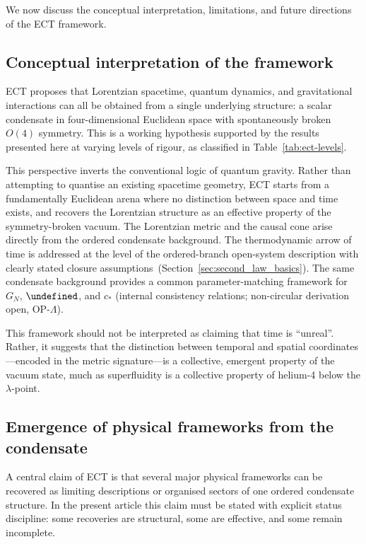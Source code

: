 \documentclass[11pt,a4paper]{article}
\let\hbar\undefined
\numberwithin{equation}{section}
\begin{document}
We now discuss the conceptual interpretation, limitations,
and future directions of the ECT framework.

\subsection{Conceptual interpretation of the framework}

ECT proposes that Lorentzian spacetime, quantum dynamics, and
gravitational interactions can all be obtained from a single
underlying structure: a scalar condensate in four-dimensional
Euclidean space with spontaneously broken $O(4)$ symmetry.
This is a working hypothesis supported by the results presented
here at varying levels of rigour, as classified in
Table~\ref{tab:ect-levels}.

This perspective inverts the conventional logic of quantum gravity.
Rather than attempting to quantise an existing spacetime geometry, ECT
starts from a fundamentally Euclidean arena where no distinction
between space and time exists, and recovers the Lorentzian structure
as an effective property of the symmetry-broken vacuum.  The
Lorentzian metric and the causal cone arise directly from the
ordered condensate background.
The thermodynamic arrow of time is addressed at the level of the
ordered-branch open-system description with clearly stated closure
assumptions~(Section~\ref{sec:second_law_basics}).
The same condensate background provides a common
parameter-matching framework for $G_N$, $\hbar$, and $c_*$
(internal consistency relations; non-circular derivation open, OP-$\Lambda$).

This framework should not be interpreted as claiming that time is
``unreal''.  Rather, it suggests that the distinction between temporal
and spatial coordinates---encoded in the metric signature---is a
collective, emergent property of the vacuum state, much as superfluidity
is a collective property of helium-4 below the $\lambda$-point.

\subsection{Emergence of physical frameworks from the condensate}
\label{subsec:emergence_chains}

A central claim of ECT is that several major physical frameworks can be
recovered as limiting descriptions or organised sectors of one ordered
condensate structure.
In the present article this claim must be stated with explicit status
discipline: some recoveries are structural, some are effective, and some
remain incomplete.
\end{document}

